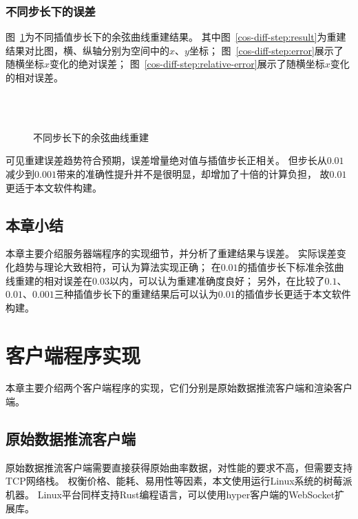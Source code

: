 \subsubsection{不同步长下的误差}
\FloatBarrier

图~\ref{fig:cos-diff-step}为不同插值步长下的余弦曲线重建结果。
其中图~\ref{cos-diff-step:result}为重建结果对比图，横、纵轴分别为空间中的$x$、$y$坐标；
图~\ref{cos-diff-step:error}展示了随横坐标$x$变化的绝对误差；
图~\ref{cos-diff-step:relative-error}展示了随横坐标$x$变化的相对误差。

\begin{figure}
\centering
{}\\
\\
\caption{不同步长下的余弦曲线重建}
\label{fig:cos-diff-step}
\end{figure}

可见重建误差趋势符合预期，误差增量绝对值与插值步长正相关。
但步长从$0.01$减少到$0.001$带来的准确性提升并不是很明显，却增加了十倍的计算负担，
故$0.01$更适于本文软件构建。

\FloatBarrier

\subsection{本章小结}
本章主要介绍服务器端程序的实现细节，并分析了重建结果与误差。
实际误差变化趋势与理论大致相符，可认为算法实现正确；
在$0.01$的插值步长下标准余弦曲线重建的相对误差在$0.03$以内，可以认为重建准确度良好；
另外，在比较了$0.1$、$0.01$、$0.001$三种插值步长下的重建结果后可以认为$0.01$的插值步长更适于本文软件构建。

\clearpage

\section{客户端程序实现}
\label{sec:client}
本章主要介绍两个客户端程序的实现，它们分别是原始数据推流客户端和渲染客户端。

\subsection{原始数据推流客户端}
原始数据推流客户端需要直接获得原始曲率数据，对性能的要求不高，但需要支持TCP网络栈。
权衡价格、能耗、易用性等因素，本文使用运行Linux系统的树莓派机器。
Linux平台同样支持Rust编程语言，可以使用hyper客户端的WebSocket扩展库。

